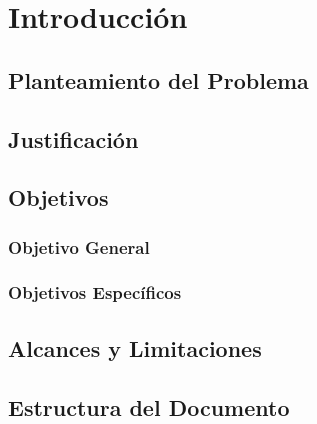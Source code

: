 \documentclass[12pt,titlepage,twoside,openright]{book}
\makeatletter
\def\cleardoublepage{\clearpage\if@twoside \ifodd\c@page\else
\hbox{}
\thispagestyle{empty}
\newpage
\if@twocolumn\hbox{}\newpage\fi\fi\fi}
\makeatother
\begin{document}

\setcounter{tocdepth}{3}
\setcounter{secnumdepth}{3}


\tableofcontents
\cleardoublepage
\listoffigures
\cleardoublepage
\listoftables
\cleardoublepage
\listofmyequations
\cleardoublepage


\mainmatter
\pagestyle{fancy}
\fancyhf{}
\fancyhead[RO,LE]{\bfseries \thepage}
\fancyhead[LO]{\nouppercase{\rightmark}}
\fancyhead[RE]{\nouppercase{\leftmark}}
\fancyfoot{}

\setlength{\parindent}{0pt}
\setlength{\parskip}{1.5ex}

\newcommand{\tab}{\hspace*{1cm}}

\chapter{Introducción}
\label{cap:introduccion}

\section{Planteamiento del Problema}
\section{Justificación}

\section{Objetivos}
\subsection{Objetivo General}
\subsection{Objetivos Específicos}

\section{Alcances y Limitaciones}

\section{Estructura del Documento}
\end{document}
